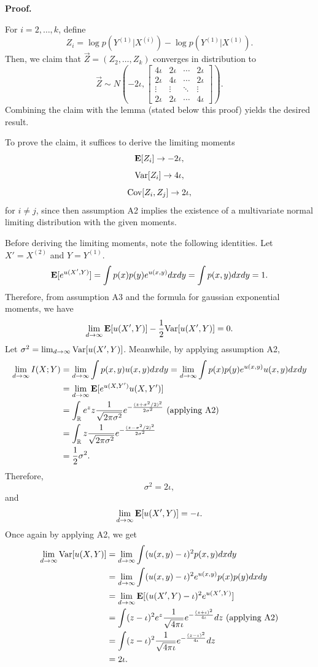 \textbf{Proof.}

For $i = 2,\hdots, k$, define
\[
Z_i = \log p(Y^{(1)}|X^{(i)}) - \log p(Y^{(1)}|X^{(1)}).
\]
Then, we claim that $\vec{Z} = (Z_2,\hdots, Z_k)$ converges in distribution to
\[
\vec{Z} \sim N\left(-2\iota, 
\begin{bmatrix}
4\iota & 2\iota & \cdots & 2\iota\\
2\iota & 4\iota & \cdots & 2\iota\\
\vdots & \vdots & \ddots & \vdots\\
2\iota & 2\iota & \cdots & 4\iota
\end{bmatrix}
\right).
\]
Combining the claim with the lemma (stated below this proof) yields the
desired result.

To prove the claim, it suffices to derive the limiting moments
\[\textbf{E}[Z_i] \to -2\iota,\]
\[\text{Var}[Z_i] \to 4\iota,\]
\[\text{Cov}[Z_i, Z_j] \to 2\iota,\]
for $i \neq j$,
since then assumption A2 implies the existence of a multivariate normal
limiting distribution with the given moments.

Before deriving the limiting moments, note the following identities.
Let $X' = X^{(2)}$ and $Y = Y^{(1)}$.
\[
\textbf{E}[e^{u(X', Y)}] = \int p(x) p(y) e^{u(x, y)} dx dy = \int p(x, y) dx dy = 1.
\]
Therefore, from assumption A3 and the formula for gaussian exponential
moments, we have
\[
\lim_{d \to \infty} \textbf{E}[u(X', Y)]-\frac{1}{2}\text{Var}[u(X', Y)] = 0.
\]
Let $\sigma^2 = \lim_{d \to \infty} \text{Var}[u(X', Y)]$.
Meanwhile, by applying assumption A2,
\begin{align*}
\lim_{d \to \infty} I(X; Y) &= \lim_{d \to \infty} \int p(x, y) u(x, y) dx dy 
= \lim_{d \to \infty} \int p(x) p(y) e^{u(x, y)} u(x, y) dx dy
\\&= \lim_{d \to \infty}  \textbf{E}[e^{u(X, Y')}u(X, Y')]
\\&= \int_{\mathbb{R}} e^z z \frac{1}{\sqrt{2\pi \sigma^2}} 
e^{-\frac{(z + \sigma^2/2)^2}{2\sigma^2}} \text{ (applying A2)}
\\&= \int_{\mathbb{R}} z \frac{1}{\sqrt{2\pi \sigma^2}} 
e^{-\frac{(z - \sigma^2/2)^2}{2\sigma^2}}
\\&= \frac{1}{2}\sigma^2.
\end{align*}
Therefore,
\[
\sigma^2 = 2\iota,
\]
and
\[
\lim_{d \to \infty} \textbf{E}[u(X', Y)] = -\iota.
\]
Once again by applying A2, we get
\begin{align*}
\lim_{d \to \infty} \text{Var}[u(X, Y)] 
&= \lim_{d \to \infty} \int (u(x, y) - \iota)^2 p(x, y) dx dy
\\&= \lim_{d \to \infty} \int (u(x, y) - \iota)^2 e^{u(x, y)} p(x) p(y) dx dy
\\&= \lim_{d \to \infty} \textbf{E}[(u(X', Y) - \iota)^2 e^{u(X', Y)}] 
\\&= \int (z - \iota)^2 e^z \frac{1}{\sqrt{4\pi\iota}} e^{-\frac{(z+\iota)^2}{4\iota}} dz \text{ (applying A2)}
\\&= \int (z - \iota)^2 \frac{1}{\sqrt{4\pi\iota}} e^{-\frac{(z-\iota)^2}{4\iota}} dz
\\&= 2\iota.
\end{align*}


